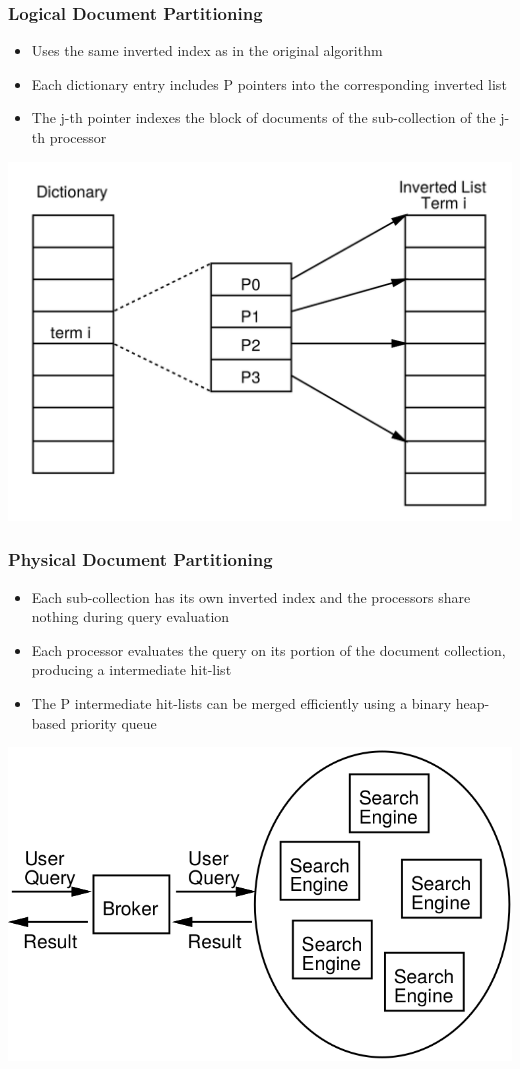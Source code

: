 \documentclass{beamer}
\begin{document}
\begin{frame}
    \frametitle{Logical Document Partitioning}
    
    \begin{itemize}
    \item Uses the same inverted index as in the original algorithm
    \item Each dictionary entry includes P pointers into the corresponding
        inverted list
    \item The j-th pointer indexes the block of documents of the sub-collection of
        the j-th processor
    \end{itemize}

    \centering
    \includegraphics[width=.7\textwidth]{logicalpartitioning}
\end{frame}


\begin{frame}
    \frametitle{Physical Document Partitioning}
    \begin{itemize}
    \item Each sub-collection has its own inverted index and the processors
        share nothing during query evaluation
    \item Each processor evaluates the query on its portion of the document
        collection, producing a intermediate hit-list
    \item The P intermediate hit-lists can be merged efficiently using a binary
        heap-based priority queue
    \end{itemize}

    \centering
    \includegraphics[width=.7\textwidth]{broker}
\end{frame}
\end{document}

